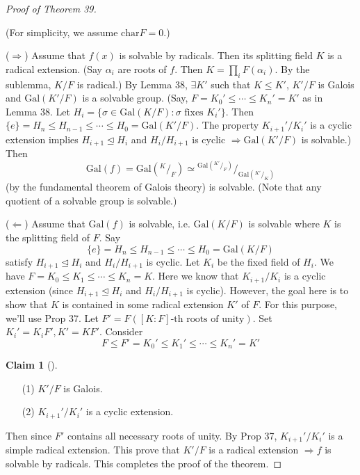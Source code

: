 \documentclass{article}
\theoremstyle{definition}
\newtheorem*{clm}{Claim}
\newenvironment{proofs}[1][\proofname]{%
  \begin{proof}[#1]$ $\par\nobreak\ignorespaces
}{%
  \end{proof}
}
\newenvironment{clms}[1][]{%
  \begin{clm}[#1]$ $\par\nobreak\ignorespaces
}{%
  \end{clm}
}
\newcommand*\quot[2]{{^{\textstyle #1}\big/_{\textstyle #2}}}
\newcommand{\Ra}{\Rightarrow}
\newcommand{\La}{\Leftarrow}
\newcommand{\Gal}{\text{Gal}}
\newcommand{\cha}{\text{char}}
\newcommand{\normto}{\trianglelefteq}
\begin{document}
\begin{proofs}[Proof of Theorem 39]
	(For simplicity, we assume $\cha F = 0$.)
	\par ($\Ra$) Assume that $f(x)$ is solvable by radicals.
	Then its splitting field $K$ is a radical extension.
	(Say $\alpha_i$ are roots of $f$.
	Then $K = \prod_i F(\alpha_i)$.
	By the sublemma, $K/F$ is radical.)
	By Lemma 38, $\exists K'$ such that $K \leq K'$, $K'/F$ is Galois and $\Gal(K'/F)$ is a solvable group.
	(Say, $F = K_0' \leq \cdots \leq K_n' = K'$ as in Lemma 38.
	Let $H_i = \{ \sigma \in \Gal(K/F): \sigma \text{ fixes } K_i'\}$.
	Then $\{e\} = H_n \leq H_{n - 1} \leq \cdots \leq H_0 = \Gal(K'/F)$.
	The property $K_{i + 1}'/K_i'$ is a cyclic extension implies $H_{i + 1} \trianglelefteq H_i$ and $H_i/H_{i + 1}$ is cyclic $\Ra \Gal(K'/F)$ is solvable.)
	Then
	\[
		\Gal(f) = \Gal \left( \quot{K}{F} \right) \simeq \quot{\Gal \left( \quot{K'}{F} \right)}{\Gal \left( \quot{K'}{K} \right)}
	\]
	(by the fundamental theorem of Galois theory) is solvable.
	(Note that any quotient of a solvable group is solvable.)
	\par ($\La$) Assume that $\Gal(f)$ is solvable, i.e. $\Gal(K/F)$ is solvable where $K$ is the splitting field of $F$.
	Say
	\[
		\{e\} = H_n \leq H_{n - 1} \leq \cdots \leq H_0 = \Gal(K/F)
	\]
	satisfy $H_{i + 1} \normto H_i$ and $H_i/H_{i + 1}$ is cyclic.
	Let $K_i$ be the fixed field of $H_i$.
	We have $F = K_0 \leq K_1 \leq \cdots \leq K_n = K$.
	Here we know that $K_{i + 1}/K_i$ is a cyclic extension (since $H_{i + 1} \normto H_i$ and $H_i/H_{i + 1}$ is cyclic).
	However, the goal here is to show that $K$ is contained in some radical extension $K'$ of $F$.
	For this purpose, we'll use Prop 37.
	Let $F' = F([K:F]\text{-th roots of unity})$.
	Set $K_i' = K_i F', K' = K F'$.
	Consider 
	\[
		F \leq F' = K_0' \leq K_1' \leq \cdots \leq K_n' = K' 
	\]

	\begin{clms}
		\begin{enumerate}
			\item[(1)] $K'/F$ is Galois.

			\item[(2)] $K_{i + 1}'/K_i'$ is a cyclic extension.
		\end{enumerate}
	\end{clms}

	Then since $F'$ contains all necessary roots of unity.
	By Prop 37, $K_{i + 1}'/K_i'$ is a simple radical extension.
	This prove that $K'/F$ is a radical extension $\Ra f$ is solvable by radicals.
	This completes the proof of the theorem.


\end{proofs}
\end{document}
